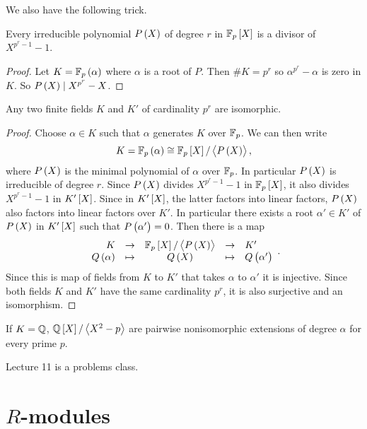 We also have the following trick.

\begin{lemma}
Every irreducible polynomial $ P\br{X} $ of degree $ r $ in $ \FF_p\sbr{X} $ is a divisor of $ X^{p^r - 1} - 1 $.
\end{lemma}

\begin{proof}
Let $ K = \FF_p\br{\alpha} $ where $ \alpha $ is a root of $ P $. Then $ \#K = p^r $ so $ \alpha^{p^r} - \alpha $ is zero in $ K $. So $ P\br{X} \mid X^{p^r} - X $.
\end{proof}

\begin{corollary}
Any two finite fields $ K $ and $ K' $ of cardinality $ p^r $ are isomorphic.
\end{corollary}

\begin{proof}
Choose $ \alpha \in K $ such that $ \alpha $ generates $ K $ over $ \mathbb{F}_p $. We can then write
$$ K = \FF_p\br{\alpha} \cong \FF_p\sbr{X} / \abr{P\br{X}}, $$
where $ P\br{X} $ is the minimal polynomial of $ \alpha $ over $ \mathbb{F}_p $. In particular $ P\br{X} $ is irreducible of degree $ r $. Since $ P\br{X} $ divides $ X^{p^r - 1} - 1 $ in $ \FF_p\sbr{X} $, it also divides $ X^{p^r - 1} - 1 $ in $ K'\sbr{X} $. Since in $ K'\sbr{X} $, the latter factors into linear factors, $ P\br{X} $ also factors into linear factors over $ K' $. In particular there exists a root $ \alpha' \in K' $ of $ P\br{X} $ in $ K'\sbr{X} $ such that $ P\br{\alpha'} = 0 $. Then there is a map
$$
\begin{array}{rcccl}
K & \to & \FF_p\sbr{X} / \abr{P\br{X}} & \to & K' \\
Q\br{\alpha} & \mapsto & Q\br{X} & \mapsto & Q\br{\alpha'}
\end{array}.
$$
Since this is map of fields from $ K $ to $ K' $ that takes $ \alpha $ to $ \alpha' $ it is injective. Since both fields $ K $ and $ K' $ have the same cardinality $ p^r $, it is also surjective and an isomorphism.
\end{proof}

If $ K = \mathbb{Q} $, $ \QQ\sbr{X} / \abr{X^2 - p} $ are pairwise nonisomorphic extensions of degree $ \alpha $ for every prime $ p $.


Lecture 11 is a problems class.

\pagebreak

\section{\texorpdfstring{$ R $}{R}-modules}

